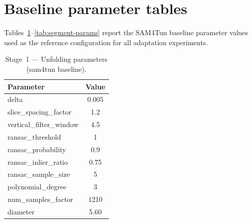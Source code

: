 
\FloatBarrier
\appendix

\section{Baseline parameter tables}\label{app:params}
Tables~\ref{tab:unfold-params}--\ref{tab:segment-params} report the SAM4Tun baseline parameter values used as the reference configuration for all adaptation experiments.

\begin{table}[ht]
\caption{Stage~1 --- Unfolding parameters (sam4tun baseline).}\label{tab:unfold-params}
\begin{tabular*}{\tblwidth}{@{} l c @{}}
\toprule
Parameter & Value \\
\midrule
delta & 0.005 \\
slice\_spacing\_factor & 1.2 \\
vertical\_filter\_window & 4.5 \\
ransac\_threshold & 1 \\
ransac\_probability & 0.9 \\
ransac\_inlier\_ratio & 0.75 \\
ransac\_sample\_size & 5 \\
polynomial\_degree & 3 \\
num\_samples\_factor & 1210 \\
diameter & 5.60 \\
\bottomrule
\end{tabular*}
\end{table}

